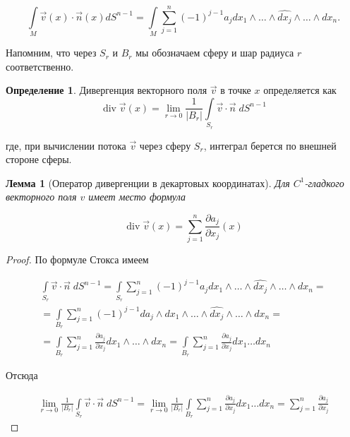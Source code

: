 \documentclass[a5paper]{article}
\newcounter{through}
\theoremstyle{plain}
\newtheorem{lemma}[through]{Лемма}
\theoremstyle{definition}
\newtheorem{definition}[through]{Определение}
\numberwithin{through}{section}
\numberwithin{equation}{section}
\DeclareMathOperator{\diver}{div}
\begin{document}
\begin{equation*}
	\int\limits_{M} \vec{v}(x) \cdot \vec{n}(x) d S^{n-1}  = \int\limits_{M} \sum\limits_{j = 1}^{n} (-1)^{j-1} a_j dx_1 \wedge \ldots \wedge \widehat{dx_j} \wedge \ldots \wedge dx_n.
\end{equation*}

Напомним, что через $S_r$ и $B_r$ мы обозначаем сферу и шар радиуса $r$ соответственно.

\begin{definition}
	Дивергенция векторного поля $\vec{v}$ в точке $x$ определяется как
	\begin{equation*}
		\diver \vec{v}(x) = \lim\limits_{r \to 0} \frac{1}{|B_r|} \int\limits_{S_r} \vec{v} \cdot \vec{n} \; dS^{n-1}
	\end{equation*}
	
	где, при вычислении потока $\vec{v}$ через сферу $S_r$, интеграл берется по внешней стороне сферы.
\end{definition}

\begin{lemma}[Оператор дивергенции в декартовых координатах]
	Для $C^1$-гладкого векторного поля $v$ имеет место формула
	
	\begin{equation*}
		\diver \vec{v}(x) = \sum\limits_{j = 1}^{n} \frac{\partial a_j}{\partial x_j}(x)
	\end{equation*}
\end{lemma}

\begin{proof}
	По формуле Стокса имеем
	
	\begin{align*}
		\int\limits_{S_r} \vec{v} \cdot \vec{n} \; dS^{n-1} = \int\limits_{S_r} \sum\limits_{j=1}^{n} (-1)^{j-1} a_j dx_1 \wedge \ldots \wedge \widehat{dx_j} \wedge \ldots \wedge dx_n = \\ = \int\limits_{B_r} \sum\limits_{j=1}^{n} (-1)^{j-1} da_j \wedge dx_1 \wedge \ldots \wedge \widehat{dx_j} \wedge \ldots \wedge dx_n = \\ = \int\limits_{B_r} \sum\limits_{j=1}^{n} \frac{\partial a_j}{\partial x_j} dx_1 \wedge \ldots \wedge dx_n = \int\limits_{B_r} \sum\limits_{j=1}^{n} \frac{\partial a_j}{\partial x_j} dx_1 \ldots dx_n
	\end{align*}
	
	Отсюда
	
	\begin{align*}
		\lim\limits_{r \to 0} \frac{1}{|B_r|} \int\limits_{S_r} \vec{v} \cdot \vec{n} \; dS^{n-1} = \lim\limits_{r \to 0} \frac{1}{|B_r|} \int\limits_{B_r} \sum\limits_{j=1}^{n} \frac{\partial a_j}{\partial x_j} dx_1 \ldots dx_n =  \sum\limits_{j=1}^{n} \frac{\partial a_j}{\partial x_j}
	\end{align*}
\end{proof}
\end{document}
